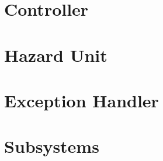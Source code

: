 \documentclass[12pt]{article}
\begin{document}
\section{Controller}


\section{Hazard Unit}


\section{Exception Handler}



\section{Subsystems}

\pagebreak


\pagebreak


\pagebreak


\pagebreak
\end{document}
